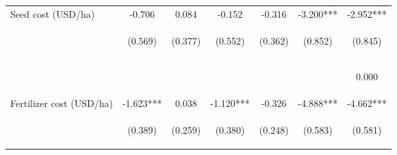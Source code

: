 \begin{center}
\begin{tabular}{lcccccc}
Seed cost (USD/ha) & -0.706 & 0.084 & -0.152 & -0.316 & -3.200*** & -2.952*** \\
 & \begin{footnotesize}(0.569)\end{footnotesize} & \begin{footnotesize}(0.377)\end{footnotesize} & \begin{footnotesize}(0.552)\end{footnotesize} & \begin{footnotesize}(0.362)\end{footnotesize} & \begin{footnotesize}(0.852)\end{footnotesize} & \begin{footnotesize}(0.845)\end{footnotesize} \\
\vspace{4pt} & \begin{footnotesize}[0.215]\end{footnotesize} & \begin{footnotesize}[0.823]\end{footnotesize} & \begin{footnotesize}[0.783]\end{footnotesize} & \begin{footnotesize}[0.382]\end{footnotesize} & \begin{footnotesize}[0.000]\end{footnotesize} & \begin{footnotesize}0.000\end{footnotesize} \\
Fertilizer cost (USD/ha) & -1.623*** & 0.038 & -1.120*** & -0.326 & -4.888*** & -4.662*** \\
 & \begin{footnotesize}(0.389)\end{footnotesize} & \begin{footnotesize}(0.259)\end{footnotesize} & \begin{footnotesize}(0.380)\end{footnotesize} & \begin{footnotesize}(0.248)\end{footnotesize} & \begin{footnotesize}(0.583)\end{footnotesize} & \begin{footnotesize}(0.581)\end{footnotesize} \\

\end{tabular}
\end{center}

